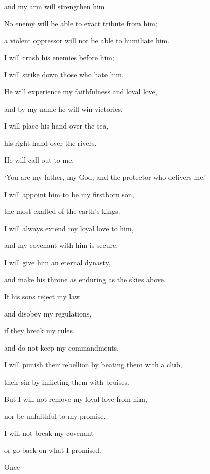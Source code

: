 {\par }{\Q and my arm
will strengthen him.
\par }{\Q {}No
enemy
will be able to exact
tribute from him;

\par }{\Q a violent oppressor
will not
be able to humiliate him.
\par }{\Q {}I will crush
his enemies
before
him;
\par }{\Q I will strike
down those who hate him.
\par }{\Q {}He will experience my faithfulness
and loyal love,
\par }{\Q and by my name
he will win
victories.
\par }{\Q {}I will place
his hand over the sea,
\par }{\Q his right hand
over the rivers.
\par }{\Q {}He
will call
out to me,
\par }{\Q ‘You
are my father,
my God,
and the protector
who delivers me.’
\par }{\Q {}I
will appoint
him to be my firstborn son,
\par }{\Q the most
exalted of the earth’s
kings.
\par }{\Q {}I will always
extend
my loyal love
to him,
\par }{\Q and my covenant
with him is secure.
\par }{\Q {}I
will give
him an eternal
dynasty,
\par }{\Q and make his throne
as enduring
as the skies above.
\par }{\Q {}If
his sons
reject
my law
\par }{\Q and disobey my regulations,
\par }{\Q {}if
they break
my rules
\par }{\Q and do not
keep
my commandments,
\par }{\Q {}I will punish
their rebellion
by beating them with a club,
\par }{\Q their sin
by inflicting them with bruises.
\par }{\Q {}But I will not
remove
my loyal love
from
him,
\par }{\Q nor
be unfaithful
to my promise.
\par }{\Q {}I will not
break
my covenant
\par }{\Q or
go back
on what I promised.
\par }{\Q {}Once
}
